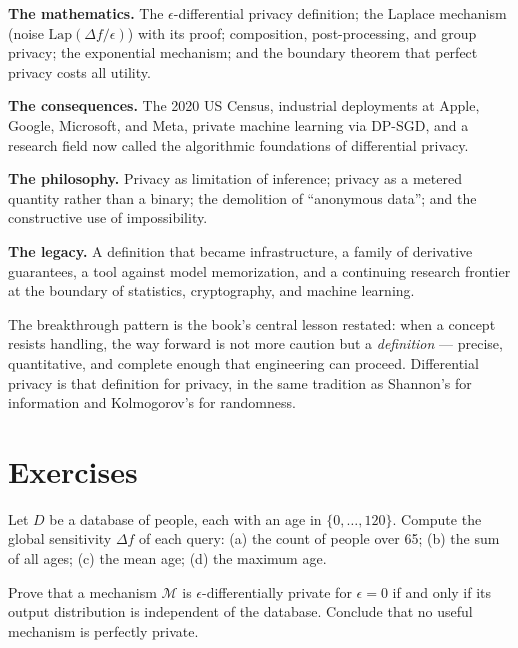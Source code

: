 \textbf{The mathematics.} The $\epsilon$-differential privacy definition; the Laplace mechanism (noise $\mathrm{Lap}(\Delta f/\epsilon)$) with its proof; composition, post-processing, and group privacy; the exponential mechanism; and the boundary theorem that perfect privacy costs all utility.

\textbf{The consequences.} The 2020 US Census, industrial deployments at Apple, Google, Microsoft, and Meta, private machine learning via DP-SGD, and a research field now called the algorithmic foundations of differential privacy.

\textbf{The philosophy.} Privacy as limitation of inference; privacy as a metered quantity rather than a binary; the demolition of ``anonymous data''; and the constructive use of impossibility.

\textbf{The legacy.} A definition that became infrastructure, a family of derivative guarantees, a tool against model memorization, and a continuing research frontier at the boundary of statistics, cryptography, and machine learning.

The breakthrough pattern is the book's central lesson restated: when a concept resists handling, the way forward is not more caution but a \emph{definition} --- precise, quantitative, and complete enough that engineering can proceed. Differential privacy is that definition for privacy, in the same tradition as Shannon's for information and Kolmogorov's for randomness.

\section{Exercises}
\label{sec:dp:exercises}

\begin{exercise}[Basic]
Let $D$ be a database of people, each with an age in $\{0, \ldots, 120\}$. Compute the global sensitivity $\Delta f$ of each query: (a) the count of people over 65; (b) the sum of all ages; (c) the mean age; (d) the maximum age.
\end{exercise}

\begin{exercise}[Basic]
Prove that a mechanism $\mathcal{M}$ is $\epsilon$-differentially private for $\epsilon = 0$ if and only if its output distribution is independent of the database. Conclude that no useful mechanism is perfectly private.
\end{exercise}

